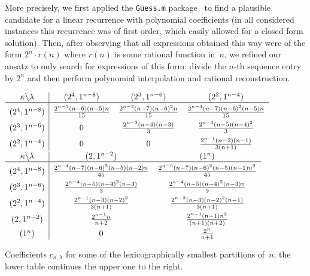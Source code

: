 \documentclass[smallextended]{svjour3}
\begin{document}
More precisely, we first applied the \texttt{Guess.m} package~\cite{Guess} to
find a plausible candidate for a linear recurrence with polynomial
coefficients (in all considered instances this recurrence was of first order,
which easily allowed for a closed form solution). Then, after observing that
all expressions obtained this way were of the form $2^n\cdot r(n)$ where
$r(n)$ is some rational function in~$n$, we refined our ansatz to only search
for expressions of this form: divide the $n$-th sequence entry by $2^n$ and
then perform polynomial interpolation and rational reconstruction.
\begin{table}
\parbox{0.8\textwidth}{
$
  \begin{array}{c|ccc}
    \kappa\backslash\lambda
    & (2^4,1^{n-8}) & (2^3,1^{n-6}) & (2^2,1^{n-4})
    \\ \hline
    \rule{0pt}{14pt}
    (2^4,1^{n-8})
    & \frac{2^{n-3} (n-6) (n-5) n}{15}
    & \frac{2^{n-3} (n-7) (n-6)^2 n}{15}
    & \frac{2^{n-4} (n-7) (n-6)^2 (n-5) n}{15}
    \\[1ex]
    (2^3,1^{n-6})
    & 0
    & \frac{2^{n-3} (n-4) (n-3)}{3}
    & \frac{2^{n-3} (n-5) (n-4)^2}{3}
    \\[1ex]
    (2^2,1^{n-4})
    & 0 & 0
    & \frac{2^{n-1} (n-2) (n-1)}{3 (n+1)}
  \end{array}
$ \\[1ex]
$
  \begin{array}{c|cc}
    \kappa\backslash\lambda
    & (2,1^{n-2}) & (1^n) \\ \hline
    \rule{0pt}{14pt}
    (2^4,1^{n-8})
    & \frac{2^{n-4} (n-7) (n-6)^2 (n-5) (n-2) n}{45}
    & \frac{2^{n-6} (n-7) (n-6)^2 (n-5) (n-1) n^2}{45}
    \\[1ex]
    (2^3,1^{n-6})
    & \frac{2^{n-4} (n-5) (n-4)^2 (n-3)}{3}
    & \frac{2^{n-4} (n-5) (n-4)^2 (n-3) n}{9}
    \\[1ex]
    (2^2,1^{n-4})
    & \frac{2^{n-1} (n-3) (n-2)^2}{3 (n+1)}
    & \frac{2^{n-2} (n-3) (n-2)^2 (n-1)}{3 (n+1)}
    \\[1ex]
    (2,1^{n-2})
    & \frac{2^{n-1} n}{n+2}
    & \frac{2^{n-1} (n-1) n^2}{(n+1) (n+2)}
    \\[1ex]
    (1^n)
    & 0 & \frac{2^n}{n+1}
  \end{array}
$ \\[1ex]
}
\caption{Coefficients $c_{\kappa,\lambda}$ for some of the lexicographically
  smallest partitions of~$n$; the lower table continues the upper one to the
  right.}
\label{tab:cn2}
\vspace{-10bp}
\end{table}
\end{document}
